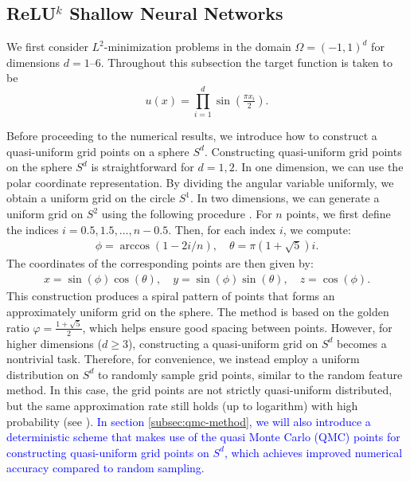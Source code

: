 \documentclass{article}
\theoremstyle{remark}
\begin{document}
\subsection{ReLU$^k$ Shallow Neural Networks}
\label{subsec:relul2}

We first consider $L^2$-minimization problems in the domain $\Omega = (-1,1)^d$ 
for dimensions $d=1$--$6$. 
Throughout this subsection the target function is taken to be
\begin{equation}
    u(x) = \prod_{i=1}^d \sin\!\left(\tfrac{\pi x_i}{2}\right).
\end{equation}
 
 Before proceeding to the numerical results, we introduce how to construct a quasi-uniform grid points on a sphere $S^d$.
 Constructing quasi-uniform grid points on the sphere $S^d$ is straightforward for $d = 1, 2$.
In one dimension, we can use the polar coordinate representation. By dividing the angular variable uniformly, we obtain a uniform grid on the circle $S^1$.
In two dimensions, we can generate a uniform grid on $S^2$ using the following procedure \cite{gonzalez2010measurement}. For $n$ points, we first define the indices $i = 0.5, 1.5, \ldots, n - 0.5$. Then, for each index $i$, we compute:
\begin{align*}
\phi = \arccos(1 - 2i/n), \quad 
\theta = \pi(1 + \sqrt{5})i.
\end{align*}
The coordinates of the corresponding points are then given by:
\begin{align*}
x = \sin(\phi)\cos(\theta), \quad 
y = \sin(\phi)\sin(\theta), \quad 
z = \cos(\phi).
\end{align*}
This construction produces a spiral pattern of points that forms an approximately uniform grid on the sphere. The method is based on the golden ratio $\varphi = \frac{1 + \sqrt{5}}{2}$, which helps ensure good spacing between points.
However, for higher dimensions ($d \geq 3$), constructing a quasi-uniform grid on $S^d$ becomes a nontrivial task.
Therefore, for convenience, we instead employ a uniform distribution on $S^d$ to randomly sample grid points, similar to the random feature method. In this case, the grid points are not strictly quasi-uniform distributed, but the same approximation rate still holds (up to logarithm) with high probability (see \cite[Theorem 6.2]{LMX2025}). 
\textcolor{blue}{In section \ref{subsec:qmc-method}, we will also introduce a deterministic scheme that makes use of the quasi Monte Carlo (QMC) points for constructing quasi-uniform grid points on $S^d$, which achieves improved numerical accuracy compared to random sampling.}
\end{document}
